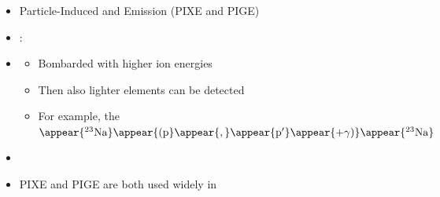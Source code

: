 \begin{frame}
\frametitle{\texorpdfstring{\culine[\sectiontitleulinecolor]{\sectiontitle}}{\sectiontitle} }

\begin{itemize}
	\item Particle-Induced  and  Emission (PIXE and PIGE)

	\item {}: 
	\item[] \begin{itemize}
	 \item Bombarded with higher ion energies 
	 \item Then also lighter elements can be detected 
	  
	 \item For example, the $\appear{{ }^{23} \mathrm{Na}}\appear{( \mathrm{p}}\appear{,} \appear{\mathrm{p}^{\prime}} \appear{+ \gamma )} \appear{{}^{23} \mathrm{Na}}$  
\end{itemize}

\item[]
\item PIXE and PIGE are both used widely in  
\end{itemize}


\endofsection
\end{frame}

